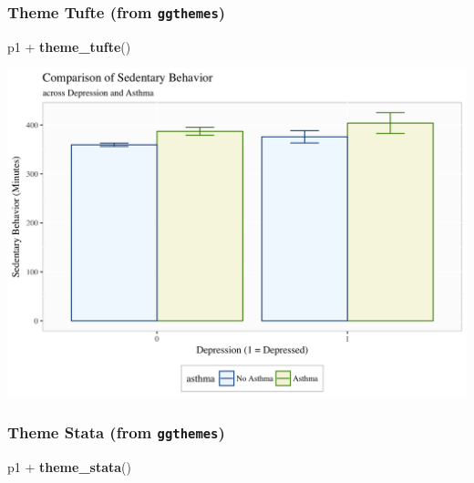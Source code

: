\documentclass[]{tufte-book}
\newenvironment{Shaded}{}{}
\newcommand{\KeywordTok}[1]{\textcolor[rgb]{0.00,0.44,0.13}{\textbf{#1}}}
\newcommand{\StringTok}[1]{\textcolor[rgb]{0.25,0.44,0.63}{#1}}
\newcommand{\OperatorTok}[1]{\textcolor[rgb]{0.40,0.40,0.40}{#1}}
\newcommand{\NormalTok}[1]{#1}
\theoremstyle{definition}
\theoremstyle{definition}
\theoremstyle{remark}
\begin{document}
\subsubsection*{\texorpdfstring{Theme Tufte (from
\texttt{ggthemes})}{Theme Tufte (from ggthemes)}}\label{theme-tufte-from-ggthemes}

\begin{Shaded}
\begin{Highlighting}[]
\NormalTok{p1 }\OperatorTok{+}\StringTok{ }\KeywordTok{theme_tufte}\NormalTok{()}
\end{Highlighting}
\end{Shaded}

\includegraphics{_main_files/figure-latex/unnamed-chunk-155-1}

\subsubsection*{\texorpdfstring{Theme Stata (from
\texttt{ggthemes})}{Theme Stata (from ggthemes)}}\label{theme-stata-from-ggthemes}

\begin{Shaded}
\begin{Highlighting}[]
\NormalTok{p1 }\OperatorTok{+}\StringTok{ }\KeywordTok{theme_stata}\NormalTok{()}
\end{Highlighting}
\end{Shaded}
\end{document}
